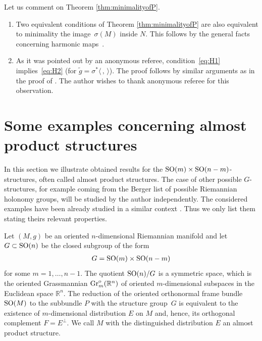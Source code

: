 \documentclass[10pt,a4paper]{amsart}
\numberwithin{equation}{section}
\newcommand{\skal}[2]{\langle #1,#2\rangle}
\begin{document}
\begin{Remark}\label{rem:H1impliesH2}
Let us comment on Theorem \ref{thm:minimalityofP}.
\begin{enumerate}\itemsep=0pt
\item Two equivalent conditions of Theorem \ref{thm:minimalityofP} are also equivalent to minimality the ima\-ge~$\sigma(M)$ inside $N$. This follows by the general facts concerning harmonic maps~\cite{el}.
\item As it was pointed out by an anonymous referee, condition~\eqref{eq:H1} implies~\eqref{eq:H2} (for $\tilde{g}=\sigma^{\ast}\skal{\,}{\,}$). The proof follows by similar arguments as in the proof of \cite[Proposition~2.5]{ggv}. The author wishes to thank anonymous referee for this observation.
\end{enumerate}
\end{Remark}

\section{Some examples concerning almost product structures}\label{section6}

In this section we illustrate obtained results for the ${\rm SO}(m)\times {\rm SO}(n-m)$-structures, often called almost product structures. The case of other possible $G$-structures, for example coming from the Berger list of possible Riemannian holonomy groups, will be studied by the author independently. The considered examples have been already studied in a similar context \cite{ggv,gd,hl}. Thus we only list them stating theirs relevant properties.

Let $(M,g)$ be an oriented $n$-dimensional Riemannian manifold and let $G\subset {\rm SO}(n)$ be the closed subgroup of the form
\begin{gather*}
G={\rm SO}(m)\times {\rm SO}(n-m)
\end{gather*}
for some $m=1,\ldots,n-1$. The quotient ${\rm SO}(n)/G$ is a symmetric space, which is the oriented Grassmannian $\operatorname{Gr}^{\rm o}_m(\mathbb{R}^n)$ of oriented $m$-dimensional subspaces in the Euclidean space $\mathbb{R}^n$. The reduction of the oriented orthonormal frame bundle ${\rm SO}(M)$ to the subbundle $P$ with the structure group~$G$ is equivalent to the existence of $m$-dimensional distribution $E$ on $M$ and, hence, its orthogonal complement $F=E^{\bot}$. We call $M$ with the distinguished distribution $E$ an almost product structure.
\end{document}
